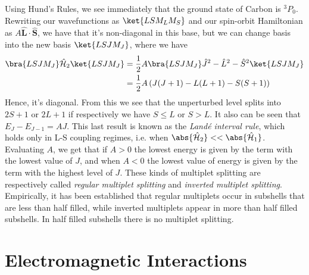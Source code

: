 \documentclass[a4paper, 11pt]{book}
\renewcommand{\vec}[1]{\mathbf{#1}}
\newcommand{\1}{\opr{\mathds{1}}}
\newcommand{\ham}{\mathcal{H}}
\newcommand{\opr}[1]{\hat{#1}}
\newcommand{\vecopr}[1]{\opr{\vec{#1}}}
\newcommand{\term}[3][]{^{#3}#2_{#1}}
\theoremstyle{plain}
\begin{document}
	Using Hund's Rules, we see immediately that the ground state of Carbon is $\term[0]{P}{3}$.\\
	Rewriting our wavefunctions as $\ket{LSM_LM_S}$ and our spin-orbit Hamiltonian as $A\vecopr{L}\cdot\vecopr{S}$, we have that it's non-diagonal in this base, but we can change basis into the new basis $\ket{LSJM_J}$, where we have
	\begin{equation}
		\begin{aligned}
			\bra{LSJM_J}\opr{\ham}_2\ket{LSJM_J}&=\frac{1}{2}A\bra{LSJM_J}\opr{J}^2-\opr{L}^2-\opr{S}^2\ket{LSJM_J}\\
			&=\frac{1}{2}A\left( J(J+1)-L(L+1)-S(S+1) \right)
		\end{aligned}
		\label{eq:neweigenvaluesham2so}
	\end{equation}
	Hence, it's diagonal. From this we see that the unperturbed level splits into $2S+1$ or $2L+1$ if respectively we have $S\le L$ or $S>L$. It also can be seen that $E_{J}-E_{J-1}=AJ$. This last result is known as the \textit{Landé interval rule}, which holds only in L-S coupling regimes, i.e. when $\abs{\opr{\ham}_2}<<\abs{\opr{\ham}_1}$. Evaluating $A$, we get that if $A>0$ the lowest energy is given by the term with the lowest value of $J$, and when $A<0$ the lowest value of energy is given by the term with the highest level of $J$. These kinds of multiplet splitting are respectively called \textit{regular multiplet splitting} and \textit{inverted multiplet splitting}. Empirically, it has been established that regular multiplets occur in subshells that are less than half filled, while inverted multiplets appear in more than half filled subshells. In half filled subshells there is no multiplet splitting.
	\chapter{Electromagnetic Interactions}
\end{document}
